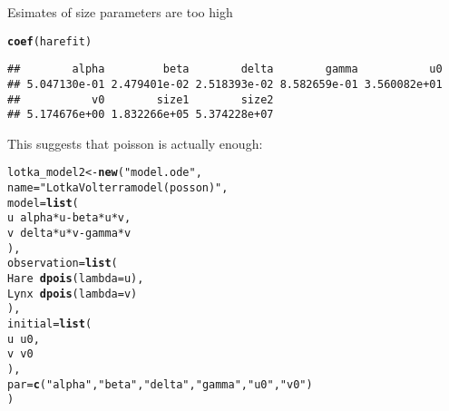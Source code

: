 \documentclass{article}\usepackage[]{graphicx}\usepackage[]{color}
\makeatletter
\newcommand{\hlstr}[1]{\textcolor[rgb]{0.192,0.494,0.8}{#1}}%
\newcommand{\hlopt}[1]{\textcolor[rgb]{0,0,0}{#1}}%
\newcommand{\hlstd}[1]{\textcolor[rgb]{0.345,0.345,0.345}{#1}}%
\newcommand{\hlkwb}[1]{\textcolor[rgb]{0.69,0.353,0.396}{#1}}%
\newcommand{\hlkwc}[1]{\textcolor[rgb]{0.333,0.667,0.333}{#1}}%
\newcommand{\hlkwd}[1]{\textcolor[rgb]{0.737,0.353,0.396}{\textbf{#1}}}%
\newenvironment{kframe}{%
 \def\at@end@of@kframe{}%
 \ifinner\ifhmode%
  \def\at@end@of@kframe{\end{minipage}}%
  \begin{minipage}{\columnwidth}%
 \fi\fi%
 \def\FrameCommand##1{\hskip\@totalleftmargin \hskip-\fboxsep
 \colorbox{shadecolor}{##1}\hskip-\fboxsep
     \hskip-\linewidth \hskip-\@totalleftmargin \hskip\columnwidth}%
 \MakeFramed {\advance\hsize-\width
   \@totalleftmargin\z@ \linewidth\hsize
   \@setminipage}}%
 {\par\unskip\endMakeFramed%
 \at@end@of@kframe}
\newenvironment{knitrout}{}{} %
\makeatother
\begin{document}
Esimates of size parameters are too high
\begin{knitrout}
\color{fgcolor}\begin{kframe}
\begin{alltt}
\hlkwd{coef}\hlstd{(harefit)}
\end{alltt}
\begin{verbatim}
##        alpha         beta        delta        gamma           u0 
## 5.047130e-01 2.479401e-02 2.518393e-02 8.582659e-01 3.560082e+01 
##           v0        size1        size2 
## 5.174676e+00 1.832266e+05 5.374228e+07
\end{verbatim}
\end{kframe}
\end{knitrout}
This suggests that poisson is actually enough:
\begin{knitrout}
\color{fgcolor}\begin{kframe}
\begin{alltt}
\hlstd{lotka_model2} \hlkwb{<-} \hlkwd{new}\hlstd{(}\hlstr{"model.ode"}\hlstd{,}
    \hlkwc{name}\hlstd{=}\hlstr{"Lotka Volterra model (posson)"}\hlstd{,}
    \hlkwc{model}\hlstd{=}\hlkwd{list}\hlstd{(}
        \hlstd{u} \hlopt{~} \hlstd{alpha} \hlopt{*} \hlstd{u} \hlopt{-} \hlstd{beta} \hlopt{*} \hlstd{u} \hlopt{*} \hlstd{v,}
        \hlstd{v} \hlopt{~} \hlstd{delta} \hlopt{*} \hlstd{u} \hlopt{*} \hlstd{v} \hlopt{-} \hlstd{gamma} \hlopt{*} \hlstd{v}
    \hlstd{),}
    \hlkwc{observation}\hlstd{=}\hlkwd{list}\hlstd{(}
        \hlstd{Hare} \hlopt{~} \hlkwd{dpois}\hlstd{(}\hlkwc{lambda}\hlstd{=u),}
        \hlstd{Lynx} \hlopt{~} \hlkwd{dpois}\hlstd{(}\hlkwc{lambda}\hlstd{=v)}
    \hlstd{),}
    \hlkwc{initial}\hlstd{=}\hlkwd{list}\hlstd{(}
        \hlstd{u} \hlopt{~} \hlstd{u0,}
        \hlstd{v} \hlopt{~} \hlstd{v0}
    \hlstd{),}
    \hlkwc{par}\hlstd{=}\hlkwd{c}\hlstd{(}\hlstr{"alpha"}\hlstd{,} \hlstr{"beta"}\hlstd{,} \hlstr{"delta"}\hlstd{,} \hlstr{"gamma"}\hlstd{,} \hlstr{"u0"}\hlstd{,} \hlstr{"v0"}\hlstd{)}
\hlstd{)}
\end{alltt}
\end{kframe}
\end{knitrout}
\end{document}
